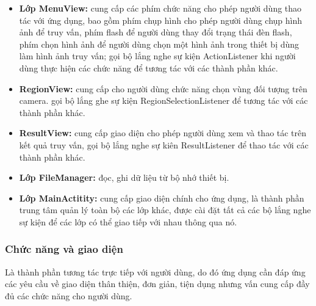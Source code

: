\begin{itemize}
\item \textbf{Lớp MenuView:} cung cấp các phím chức năng cho phép người dùng thao tác với ứng dụng, bao gồm phím chụp hình cho phép người dùng chụp hình ảnh để truy vấn, phím flash để người dùng thay đổi trạng thái đèn flash, phím chọn hình ảnh để người dùng chọn một hình ảnh trong thiết bị dùng làm hình ảnh truy vấn; gọi bộ lắng nghe sự kiện ActionListener khi người dùng thực hiện các chức năng để tương tác với các thành phần khác.

\item \textbf{RegionView:} cung cấp cho người dùng chức năng chọn vùng đối tượng trên camera. gọi bộ lắng ghe sự kiện RegionSelectionListener để tương tác với các thành phần khác.

\item \textbf{ResultView:} cung cấp giao diện cho phép người dùng xem và thao tác trên kết quả truy vấn, gọi bộ lắng nghe sự kiên ResultListener để thao tác với các thành phần khác.

\item \textbf{Lớp FileManager:} đọc, ghi dữ liệu từ bộ nhớ thiết bị.

\item \textbf{Lớp MainActitity:} cung cấp giao diện chính cho ứng dụng, là thành phần trung tâm quản lý toàn bộ các lớp khác, được cài đặt tất cả các bộ lắng nghe sự kiện để các lớp có thể giao tiếp với nhau thông qua nó.

\end{itemize}

\subsubsection{Chức năng và giao diện}
Là thành phần tương tác trực tiếp với người dùng, do đó ứng dụng cần đáp ứng các yêu cầu về giao diện thân thiện, đơn giản, tiện dụng nhưng vấn cung cấp đầy đủ các chức năng cho người dùng.


